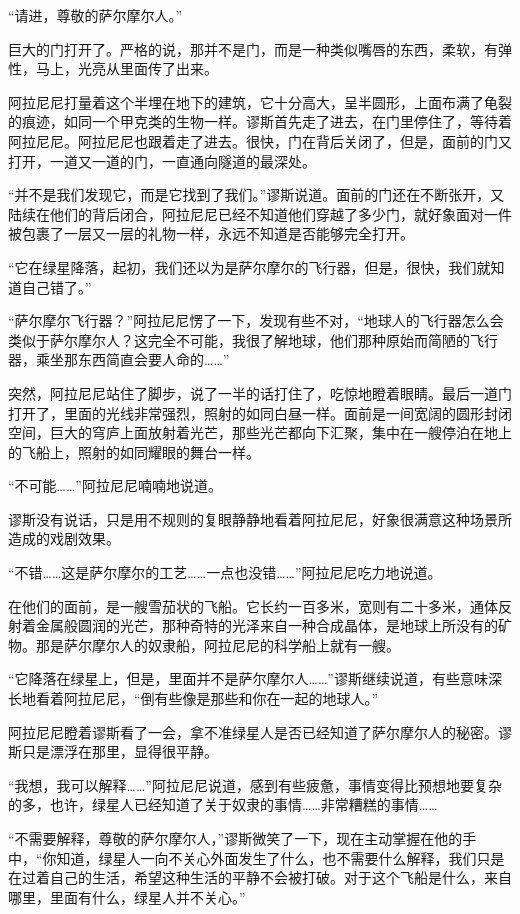 “请进，尊敬的萨尔摩尔人。”

巨大的门打开了。严格的说，那并不是门，而是一种类似嘴唇的东西，柔软，有弹性，马上，光亮从里面传了出来。

阿拉尼尼打量着这个半埋在地下的建筑，它十分高大，呈半圆形，上面布满了龟裂的痕迹，如同一个甲克类的生物一样。谬斯首先走了进去，在门里停住了，等待着阿拉尼尼。阿拉尼尼也跟着走了进去。很快，门在背后关闭了，但是，面前的门又打开，一道又一道的门，一直通向隧道的最深处。

“并不是我们发现它，而是它找到了我们。”谬斯说道。面前的门还在不断张开，又陆续在他们的背后闭合，阿拉尼尼已经不知道他们穿越了多少门，就好象面对一件被包裹了一层又一层的礼物一样，永远不知道是否能够完全打开。

“它在绿星降落，起初，我们还以为是萨尔摩尔的飞行器，但是，很快，我们就知道自己错了。”

“萨尔摩尔飞行器？”阿拉尼尼愣了一下，发现有些不对，“地球人的飞行器怎么会类似于萨尔摩尔人？这完全不可能，我很了解地球，他们那种原始而简陋的飞行器，乘坐那东西简直会要人命的……”

突然，阿拉尼尼站住了脚步，说了一半的话打住了，吃惊地瞪着眼睛。最后一道门打开了，里面的光线非常强烈，照射的如同白昼一样。面前是一间宽阔的圆形封闭空间，巨大的穹庐上面放射着光芒，那些光芒都向下汇聚，集中在一艘停泊在地上的飞船上，照射的如同耀眼的舞台一样。

“不可能……”阿拉尼尼喃喃地说道。

谬斯没有说话，只是用不规则的复眼静静地看着阿拉尼尼，好象很满意这种场景所造成的戏剧效果。

“不错……这是萨尔摩尔的工艺……一点也没错……”阿拉尼尼吃力地说道。

在他们的面前，是一艘雪茄状的飞船。它长约一百多米，宽则有二十多米，通体反射着金属般圆润的光芒，那种奇特的光泽来自一种合成晶体，是地球上所没有的矿物。那是萨尔摩尔人的奴隶船，阿拉尼尼的科学船上就有一艘。

“它降落在绿星上，但是，里面并不是萨尔摩尔人……”谬斯继续说道，有些意味深长地看着阿拉尼尼，“倒有些像是那些和你在一起的地球人。”

阿拉尼尼瞪着谬斯看了一会，拿不准绿星人是否已经知道了萨尔摩尔人的秘密。谬斯只是漂浮在那里，显得很平静。

“我想，我可以解释……”阿拉尼尼说道，感到有些疲惫，事情变得比预想地要复杂的多，也许，绿星人已经知道了关于奴隶的事情……非常糟糕的事情……

“不需要解释，尊敬的萨尔摩尔人，”谬斯微笑了一下，现在主动掌握在他的手中，“你知道，绿星人一向不关心外面发生了什么，也不需要什么解释，我们只是在过着自己的生活，希望这种生活的平静不会被打破。对于这个飞船是什么，来自哪里，里面有什么，绿星人并不关心。”

